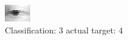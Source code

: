 \begin{figure}[h!]
\begin{center}
\includegraphics[width=0.60\columnwidth]{figures/ID2706_class_3_target_4.png}
\end{center}
\caption{ Classification: 3 actual target: 4}
\label{fig:ID2706_class_3_target_4}
\end{figure}
